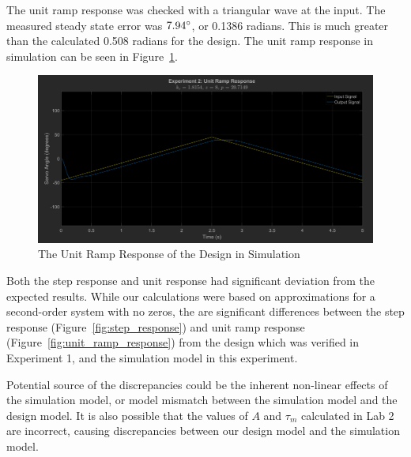 \documentclass[12pt]{article}
\begin{document}
The unit ramp response was checked with a triangular wave at the input. The measured steady state error was $7.94\degree$, or 0.1386 radians. This is much greater than the calculated 0.508 radians for the design. The unit ramp response in simulation can be seen in Figure~\ref{fig:exp2_unit_ramp}.

\begin{figure}[h!]
	\centering
	\includegraphics[width=\textwidth]{exp2_unit_ramp_response}
	\caption{\label{fig:exp2_unit_ramp}The Unit Ramp Response of the Design in Simulation}
\end{figure}

Both the step response and unit response had significant deviation from the expected results. While our calculations were based on approximations for a second-order system with no zeros, the are significant differences between the step response (Figure~\ref{fig:step_response}) and unit ramp response (Figure~\ref{fig:unit_ramp_response}) from the design which was verified in Experiment 1, and the simulation model in this experiment.

Potential source of the discrepancies could be the inherent non-linear effects of the simulation model, or model mismatch between the simulation model and the design model. It is also possible that the values of $A$ and $\tau_m$ calculated in Lab 2 are incorrect, causing discrepancies between our design model and the simulation model.
\end{document}
